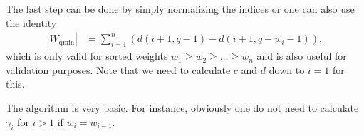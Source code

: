 \documentclass[review]{elsarticle}
\theoremstyle{defn}
\theoremstyle{Pseudo-Code}
\begin{document}
The last step can be done by simply normalizing the indices or one can also use the identity
\begin{align*}
    |W_\text{qmin}|
    &=
    \sum_{i=1}^n (d(i+1,q-1)-d(i+1,q-w_i-1))
    ,
  \end{align*}
which is only valid for sorted weights $w_1\geq w_2\geq\dots\geq w_n$ and is also useful for validation purposes. Note that we need to calculate $c$ and $d$ down to $i=1$ for this.

The algorithm is very basic. For instance, obviously one do not need to calculate $\gamma_i$ for $i>1$ if $w_i=w_{i-1}$.
\end{document}
